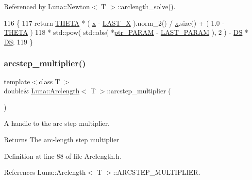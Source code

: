 Referenced by Luna\+::\+Newton$<$ T $>$\+::arclength\+\_\+solve().


\begin{DoxyCode}
116   \{
117     \textcolor{keywordflow}{return} \hyperlink{classLuna_1_1Arclength_aa17766cf4bcbe5b063dc2a95f89baf42}{THETA} * ( \hyperlink{namespaceHeat__plot_aa88370c16b85b784ccbde3ed88bc1991}{x} - \hyperlink{classLuna_1_1Arclength_a6d6ba83245b4dd616d265609a93035a2}{LAST\_X} ).norm\_2() / \hyperlink{namespaceHeat__plot_aa88370c16b85b784ccbde3ed88bc1991}{x}.size() + ( 1.0 - 
      \hyperlink{classLuna_1_1Arclength_aa17766cf4bcbe5b063dc2a95f89baf42}{THETA} )
118                * std::pow( std::abs( *\hyperlink{classLuna_1_1Arclength_a984cead721a38abf1ab2a489052461e0}{ptr\_PARAM} - \hyperlink{classLuna_1_1Arclength_a98e8241f24a16ea9f12e514d8d8f841b}{LAST\_PARAM} ), 2 ) - 
      \hyperlink{classLuna_1_1Arclength_a6797d7b76d3e27c00b9c4c6ab9970405}{DS} * \hyperlink{classLuna_1_1Arclength_a6797d7b76d3e27c00b9c4c6ab9970405}{DS};
119   \}
\end{DoxyCode}
\mbox{\label{classLuna_1_1Arclength_a2c080f19e24df1cd4e146bd79a88b6c7}} 
\subsubsection{\texorpdfstring{arcstep\+\_\+multiplier()}{arcstep\_multiplier()}}
{\footnotesize\ttfamily template$<$class T $>$ \\
double\& \hyperlink{classLuna_1_1Arclength}{Luna\+::\+Arclength}$<$ T $>$\+::arcstep\+\_\+multiplier (\begin{DoxyParamCaption}{ }\end{DoxyParamCaption})\hspace{0.3cm}{\ttfamily [inline]}}



A handle to the arc step multiplier. 

\begin{DoxyReturn}{Returns}
The arc-\/length step multiplier 
\end{DoxyReturn}


Definition at line 88 of file Arclength.\+h.



References Luna\+::\+Arclength$<$ T $>$\+::\+A\+R\+C\+S\+T\+E\+P\+\_\+\+M\+U\+L\+T\+I\+P\+L\+I\+ER.


